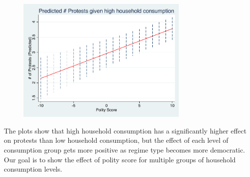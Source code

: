 \documentclass[12pt]{article}
\begin{document}
  \begin{figure}[H]
    \centering
    \includegraphics[width=0.75\textwidth]{polity90.pdf}
    \end{figure}

    
The plots show that high household consumption has a significantly higher effect on protests than low household consumption, but the effect of each level of consumption group gets more positive as regime type becomes more democratic. Our goal is to show the effect of polity score for multiple groups of household consumption levels.  
\end{document}
